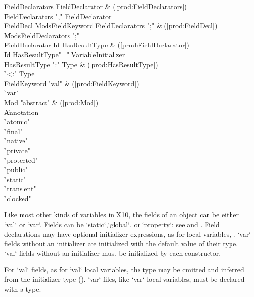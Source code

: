 \begin{bbgrammar}
 FieldDeclarators    \: FieldDeclarator & (\ref{prod:FieldDeclarators})\\%
    \| FieldDeclarators \xcd"," FieldDeclarator\\
 FieldDecl    \: Mods\opt FieldKeyword FieldDeclarators \xcd";" & (\ref{prod:FieldDecl})\\%
    \| Mods\opt FieldDeclarators \xcd";"\\
 FieldDeclarator    \: Id HasResultType & (\ref{prod:FieldDeclarator})\\%
    \| Id HasResultType\opt \xcd"=" VariableInitializer\\
 HasResultType    \: \xcd":" Type & (\ref{prod:HasResultType})\\%
    \| \xcd"<:" Type\\
 FieldKeyword    \: \xcd"val" & (\ref{prod:FieldKeyword})\\%
    \| \xcd"var"\\
 Mod    \: \xcd"abstract" & (\ref{prod:Mod})\\%
    \| Annotation\\
    \| \xcd"atomic"\\
    \| \xcd"final"\\
    \| \xcd"native"\\
    \| \xcd"private"\\
    \| \xcd"protected"\\
    \| \xcd"public"\\
    \| \xcd"static"\\
    \| \xcd"transient"\\
    \| \xcd"clocked"\\

\end{bbgrammar}

Like most other kinds of variables in X10, 
the fields of an object can be either \xcd`val` or \xcd`var`. 
Fields can be \xcd`static`,\xcd`global`, or \xcd`property`; see
 and .
Field declarations may have optional
initializer expressions, as for local variables, .
\xcd`var` fields without an initializer are initialized with the default value
of their type. \xcd`val` fields without an initializer must be initialized by
each constructor.


For \xcd`val` fields, as for \xcd`val` local variables, the type may be
omitted and inferred from the initializer type ().
\xcd`var` files, like \xcd`var` local variables, must be declared with a type.



